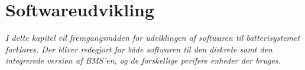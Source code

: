 \chapter{Softwareudvikling}\label{kap:softwareudvikling}

\emph{I dette kapitel vil fremgangsmåden for udviklingen af softwaren til batterisystemet forklares. Der bliver redegjort for både softwaren til den diskrete samt den integrerede version af BMS'en, og de forskellige perifere enheder der bruges.}